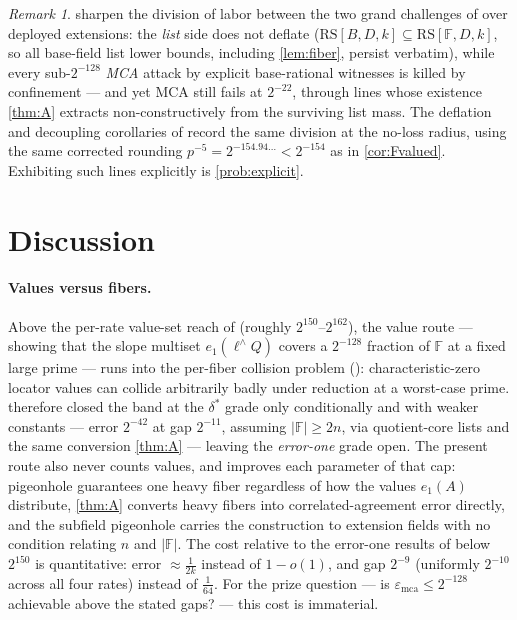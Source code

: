 \documentclass[11pt]{article}
\theoremstyle{definition}
\theoremstyle{remark}
\newtheorem{remark}[theorem]{Remark}
\newcommand{\F}{\mathbb{F}}
\newcommand{\B}{B}
\newcommand{\RS}{\mathrm{RS}}
\newcommand{\emca}{\varepsilon_{\mathrm{mca}}}
\newcommand{\eone}{e_1}
\begin{document}
\begin{remark}
 sharpen the division of labor between the two grand challenges of \cite{ABF26} over deployed extensions: the \emph{list} side does not deflate ($\RS[\B,D,k]\subseteq\RS[\F,D,k]$, so all base-field list lower bounds, including \cref{lem:fiber}, persist verbatim), while every sub-$2^{-128}$ \emph{MCA} attack by explicit base-rational witnesses is killed by confinement --- and yet MCA still fails at $2^{-22}$, through lines whose existence \cref{thm:A} extracts non-constructively from the surviving list mass. The deflation and decoupling corollaries of \cite{Cho26b} record the same division at the no-loss radius, using the same corrected rounding $p^{-5}=2^{-154.94\ldots}<2^{-154}$ as in \cref{cor:Fvalued}. Exhibiting such lines explicitly is \cref{prob:explicit}.
\end{remark}

\section{Discussion}\label{sec:discussion}

\paragraph{Values versus fibers.}
Above the per-rate value-set reach of \cite{Cho26b} (roughly $2^{150}$--$2^{162}$), the value route --- showing that the slope multiset $\eone(\ell^\wedge Q)$ covers a $2^{-128}$ fraction of $\F$ at a fixed large prime --- runs into the per-fiber collision problem (\cite[Rem.\ ``The remaining band'']{Cho26b}): characteristic-zero locator values can collide arbitrarily badly under reduction at a worst-case prime. \cite{Cho26b} therefore closed the band at the $\delta^*$ grade only conditionally and with weaker constants --- error $2^{-42}$ at gap $2^{-11}$, assuming $|\F|\ge2n$, via quotient-core lists and the same conversion \cref{thm:A} --- leaving the \emph{error-one} grade open. The present route also never counts values, and improves each parameter of that cap: pigeonhole guarantees one heavy fiber regardless of how the values $\eone(A)$ distribute, \cref{thm:A} converts heavy fibers into correlated-agreement error directly, and the subfield pigeonhole carries the construction to extension fields with no condition relating $n$ and $|\F|$. The cost relative to the error-one results of \cite{Cho26a,Cho26b} below $2^{150}$ is quantitative: error $\approx\frac1{2k}$ instead of $1-o(1)$, and gap $2^{-9}$ (uniformly $2^{-10}$ across all four rates) instead of $\frac1{64}$. For the prize question --- is $\emca\le2^{-128}$ achievable above the stated gaps? --- this cost is immaterial.
\end{document}
